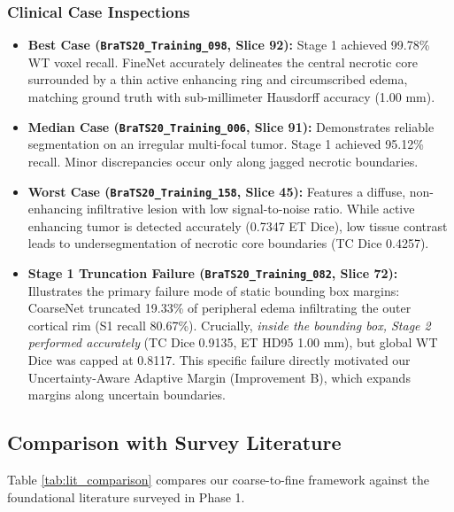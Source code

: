 \documentclass[12pt, a4paper]{article}
\begin{document}
\subsubsection{Clinical Case Inspections}
\begin{itemize}[leftmargin=*, itemsep=4pt]
    \item \textbf{Best Case (\texttt{BraTS20\_Training\_098}, Slice 92):} Stage 1 achieved 99.78\% WT voxel recall. FineNet accurately delineates the central necrotic core surrounded by a thin active enhancing ring and circumscribed edema, matching ground truth with sub-millimeter Hausdorff accuracy (1.00 mm).
    \item \textbf{Median Case (\texttt{BraTS20\_Training\_006}, Slice 91):} Demonstrates reliable segmentation on an irregular multi-focal tumor. Stage 1 achieved 95.12\% recall. Minor discrepancies occur only along jagged necrotic boundaries.
    \item \textbf{Worst Case (\texttt{BraTS20\_Training\_158}, Slice 45):} Features a diffuse, non-enhancing infiltrative lesion with low signal-to-noise ratio. While active enhancing tumor is detected accurately (0.7347 ET Dice), low tissue contrast leads to undersegmentation of necrotic core boundaries (TC Dice 0.4257).
    \item \textbf{Stage 1 Truncation Failure (\texttt{BraTS20\_Training\_082}, Slice 72):} Illustrates the primary failure mode of static bounding box margins: CoarseNet truncated 19.33\% of peripheral edema infiltrating the outer cortical rim (S1 recall 80.67\%). Crucially, \textit{inside the bounding box, Stage 2 performed accurately} (TC Dice 0.9135, ET HD95 1.00 mm), but global WT Dice was capped at 0.8117. This specific failure directly motivated our Uncertainty-Aware Adaptive Margin (Improvement B), which expands margins along uncertain boundaries.
\end{itemize}

\newpage

\subsection{Comparison with Survey Literature}
Table \ref{tab:lit_comparison} compares our coarse-to-fine framework against the foundational literature surveyed in Phase 1.
\end{document}
